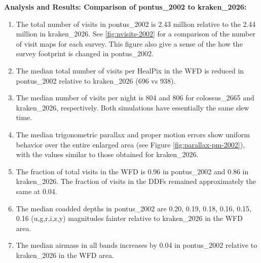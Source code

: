 \documentclass[DM,authoryear,toc]{lsstdoc}
\begin{document}
\textbf{Analysis and Results: Comparison of pontus\_2002 to kraken\_2026:}

\begin{enumerate}
\item The total number of visits in pontus\_2002 is 2.43 million relative to the 2.44 million in kraken\_2026. See \autoref{fig:nvisits-2002}
for a comparison of the number of visit maps for each survey. This figure also give a sense of the how the survey footprint is changed
in pontus\_2002.
\item The median total number of visits per HealPix in the WFD is reduced in pontus\_2002 relative to kraken\_2026 (696 vs 938).
\item The median number of visits per night is 804 and 806 for colossus\_2665 and kraken\_2026, respectively.
Both simulations have essentially the same slew time.
\item The median trigonometric parallax and proper motion errors show uniform behavior over the entire enlarged area
(see Figure \autoref{fig:parallax-pm-2002}), with the values similar to those obtained for kraken\_2026.
\item The fraction of total visits in the WFD is 0.96 in pontus\_2002 and 0.86 in kraken\_2026. The fraction of visits
in the DDFs remained approximately the same at 0.04.
\item The median coadded depths in pontus\_2002 are 0.20, 0.19, 0.18, 0.16, 0.15, 0.16 (u,g,r,i,z,y) magnitudes fainter relative
to kraken\_2026 in the WFD area.
\item The median airmass in all bands increases by 0.04 in pontus\_2002 relative to kraken\_2026 in the WFD area.
\end{enumerate}
\end{document}
